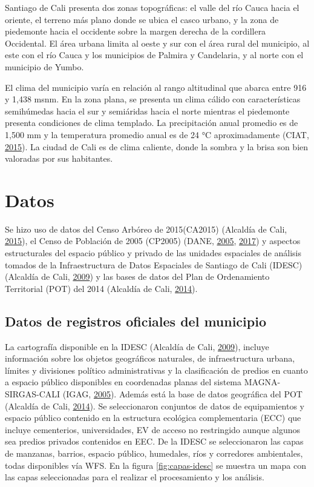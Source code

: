 \documentclass[12pt,a4paper,openany]{book}
\theoremstyle{definition}
\theoremstyle{definition}
\theoremstyle{definition}
\theoremstyle{remark}
\begin{document}
Santiago de Cali presenta dos zonas topográficas: el valle del río Cauca
hacia el oriente, el terreno más plano donde se ubica el casco urbano, y
la zona de piedemonte hacia el occidente sobre la margen derecha de la
cordillera Occidental. El área urbana limita al oeste y sur con el área
rural del municipio, al este con el río Cauca y los municipios de
Palmira y Candelaria, y al norte con el municipio de Yumbo.

El clima del municipio varía en relación al rango altitudinal que abarca
entre 916 y 1,438 msnm. En la zona plana, se presenta un clima cálido
con características semihúmedas hacia el sur y semiáridas hacia el norte
mientras el piedemonte presenta condiciones de clima templado. La
precipitación anual promedio es de 1,500 mm y la temperatura promedio
anual es de 24 °C aproximadamente (CIAT,
\protect\hyperlink{ref-ciat_plan_2015}{2015}). La ciudad de Cali es de
clima caliente, donde la sombra y la brisa son bien valoradas por sus
habitantes.

\section{Datos}\label{datos}

Se hizo uso de datos del Censo Arbóreo de 2015(CA2015) (Alcaldía de
Cali, \protect\hyperlink{ref-ca2015cali}{2015}), el Censo de Población
de 2005 (CP2005) (DANE,
\protect\hyperlink{ref-censo_sistema_dane}{2005},
\protect\hyperlink{ref-geoportal_DANE}{2017}) y aspectos estructurales
del espacio público y privado de las unidades espaciales de análisis
tomados de la Infraestructura de Datos Espaciales de Santiago de Cali
(IDESC) (Alcaldía de Cali,
\protect\hyperlink{ref-geoportal_idesc}{2009}) y las bases de datos del
Plan de Ordenamiento Territorial (POT) del 2014 (Alcaldía de Cali,
\protect\hyperlink{ref-pot2014cali}{2014}).

\subsection{Datos de registros oficiales del
municipio}\label{datos-de-registros-oficiales-del-municipio}

La cartografía disponible en la IDESC (Alcaldía de Cali,
\protect\hyperlink{ref-geoportal_idesc}{2009}), incluye información
sobre los objetos geográficos naturales, de infraestructura urbana,
límites y divisiones político administrativas y la clasificación de
predios en cuanto a espacio público disponibles en coordenadas planas
del sistema MAGNA-SIRGAS-CALI (IGAG,
\protect\hyperlink{ref-igagMC2005}{2005}). Además está la base de datos
geográfica del POT (Alcaldía de Cali,
\protect\hyperlink{ref-pot2014cali}{2014}). Se seleccionaron conjuntos
de datos de equipamientos y espacio público contenido en la estructura
ecológica complementaria (ECC) que incluye cementerios, universidades,
EV de acceso no restringido aunque algunos sea predios privados
contenidos en EEC. De la IDESC se seleccionaron las capas de manzanas,
barrios, espacio público, humedales, ríos y corredores ambientales,
todas disponibles vía WFS. En la figura \ref{fig:capas-idesc} se muestra
un mapa con las capas seleccionadas para el realizar el procesamiento y
los análisis.
\end{document}
